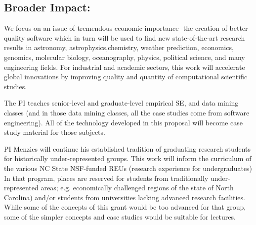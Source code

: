 \documentclass{NSF}
\begin{document}
\begin{nsfdescription}
 

\subsection{Broader Impact:} 
We focus on an issue of tremendous economic importance- the creation of better quality software which in turn will be used to find new state-of-the-art research results
in astronomy, astrophysics,chemistry, weather prediction, economics,  genomics,  molecular   biology,    oceanography, physics,  political  science,  and many engineering fields.
For industrial and academic sectors, this work will accelerate global innovations by improving quality and quantity of computational scientific studies.

The PI   teaches senior-level and graduate-level empirical SE, and data  mining classes (and in those data mining classes, all the case studies come from software  engineering). All of the technology developed in this proposal will become case study material for those subjects.  
 
PI Menzies will continue his established tradition of graduating research students for historically under-represented groups. This work will inform the curriculum of  the various NC State  NSF-funded REUs (research experience for undergraduates)
In that program, places are reserved for students from traditionally under-represented areas; e.g. economically challenged regions of the state of North Carolina) and/or students from universities lacking advanced research facilities. While some of the concepts of this grant would be too advanced for that group, some of the simpler concepts and case studies would be suitable for lectures.
  



\end{nsfdescription}
\end{document}
